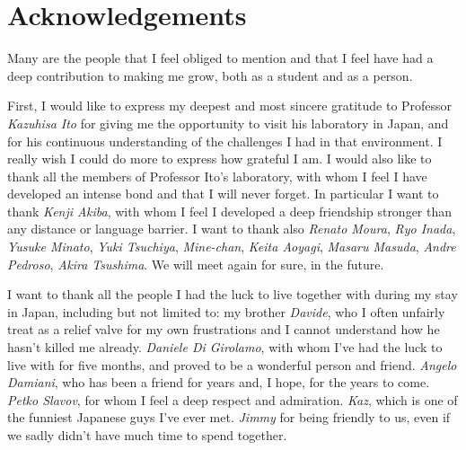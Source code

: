 


\begingroup

\let\clearpage\relax
\let\cleardoublepage\relax
\let\cleardoublepage\relax

\chapter*{Acknowledgements}

\noindent Many are the people that I feel obliged to mention and that I feel have
had a deep contribution to making me grow, both as a student and as a person.

First, I would like to express my deepest and most sincere gratitude
to Professor \textit{Kazuhisa Ito} for giving me the opportunity to visit
his laboratory in Japan, and for his continuous understanding of the challenges
I had in that environment. I really wish I could do more to express how grateful I am.
I would also like to thank all the members of Professor Ito's laboratory,
with whom I feel I have developed an intense bond and that I will never forget.
In particular I want to thank \textit{Kenji Akiba}, with whom I feel I developed a
deep friendship stronger than any distance or language barrier. I want to thank
also \textit{Renato Moura}, \textit{Ryo Inada}, \textit{Yusuke Minato},
\textit{Yuki Tsuchiya}, \textit{Mine-chan}, \textit{Keita Aoyagi},
\textit{Masaru Masuda}, \textit{Andre Pedroso}, \textit{Akira Tsushima}.
We will meet again for sure, in the future.

I want to thank all the people I had the luck to live together with
during my stay in Japan, including but not limited to:
my brother \textit{Davide}, who I often unfairly treat as a relief valve
for my own frustrations and I cannot understand how he hasn't killed me already.
\textit{Daniele Di Girolamo}, with whom I've had the luck to
live with for five months, and proved to be a wonderful person and friend.
\textit{Angelo Damiani}, who has been a friend for years and, I hope, for the years to come.
\textit{Petko Slavov}, for whom I feel a deep respect and admiration.
\textit{Kaz}, which is one of the funniest Japanese guys I've ever met.
\textit{Jimmy} for being friendly to us, even if we sadly didn't have much
time to spend together.

